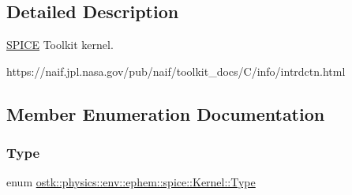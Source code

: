 \subsection{Detailed Description}
\hyperlink{classostk_1_1physics_1_1env_1_1ephem_1_1_s_p_i_c_e}{S\+P\+I\+CE} Toolkit kernel. 

https\+://naif.jpl.\+nasa.\+gov/pub/naif/toolkit\+\_\+docs/\+C/info/intrdctn.html 

\subsection{Member Enumeration Documentation}
\mbox{\label{classostk_1_1physics_1_1env_1_1ephem_1_1spice_1_1_kernel_a76d560bbface15a0cb24cd82e9a93d77}} 
\subsubsection{\texorpdfstring{Type}{Type}}
{\footnotesize\ttfamily enum \hyperlink{classostk_1_1physics_1_1env_1_1ephem_1_1spice_1_1_kernel_a76d560bbface15a0cb24cd82e9a93d77}{ostk\+::physics\+::env\+::ephem\+::spice\+::\+Kernel\+::\+Type}\hspace{0.3cm}{\ttfamily [strong]}}

